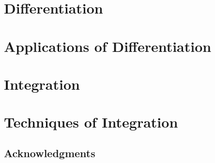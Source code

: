 \documentclass[11pt, a4paper, oneside]{memoir}
\begin{document}
\frontmatter
{}




\clearpage

\tableofcontents*



\mainmatter

\part{Differentiation}













\part{Applications of Differentiation}







\part{Integration}

\part{Techniques of Integration}

\backmatter

\chapter{Acknowledgments}
\Blindtext





\end{document}
